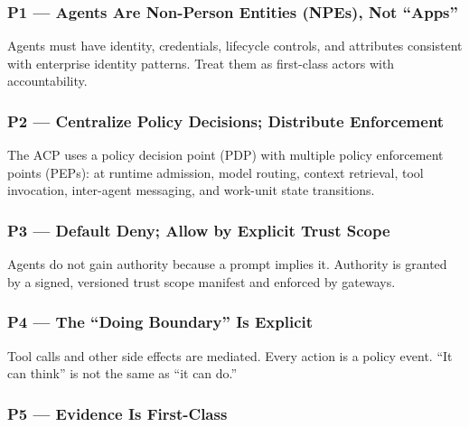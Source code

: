 \documentclass[11pt]{article}
\begin{document}
\hypertarget{p1-agents-are-non-person-entities-npes-not-apps}{%
\subsubsection{P1 --- Agents Are Non-Person Entities (NPEs), Not ``Apps''}\label{p1-agents-are-non-person-entities-npes-not-apps}}

Agents must have identity, credentials, lifecycle controls, and
attributes consistent with enterprise identity patterns. Treat them as
first-class actors with accountability.

\hypertarget{p2-centralize-policy-decisions-distribute-enforcement}{%
\subsubsection{P2 --- Centralize Policy Decisions; Distribute Enforcement}\label{p2-centralize-policy-decisions-distribute-enforcement}}

The ACP uses a policy decision point (PDP) with multiple policy
enforcement points (PEPs): at runtime admission, model routing, context
retrieval, tool invocation, inter-agent messaging, and work-unit state
transitions.

\hypertarget{p3-default-deny-allow-by-explicit-trust-scope}{%
\subsubsection{P3 --- Default Deny; Allow by Explicit Trust Scope}\label{p3-default-deny-allow-by-explicit-trust-scope}}

Agents do not gain authority because a prompt implies it. Authority is
granted by a signed, versioned trust scope manifest and enforced by
gateways.

\hypertarget{p4-the-doing-boundary-is-explicit}{%
\subsubsection{P4 --- The ``Doing Boundary'' Is Explicit}\label{p4-the-doing-boundary-is-explicit}}

Tool calls and other side effects are mediated. Every action is a policy
event. ``It can think'' is not the same as ``it can do.''

\hypertarget{p5-evidence-is-first-class}{%
\subsubsection{P5 --- Evidence Is First-Class}\label{p5-evidence-is-first-class}}
\end{document}

